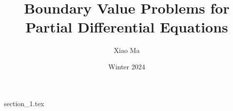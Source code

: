\documentclass{article}
\title{Boundary Value Problems for Partial Differential Equations}
\author{Xiao Ma}
\date{Winter 2024}
\theoremstyle{remark}
\numberwithin{equation}{section}
\begin{document}
\maketitle

{section_1.tex}
\end{document}
